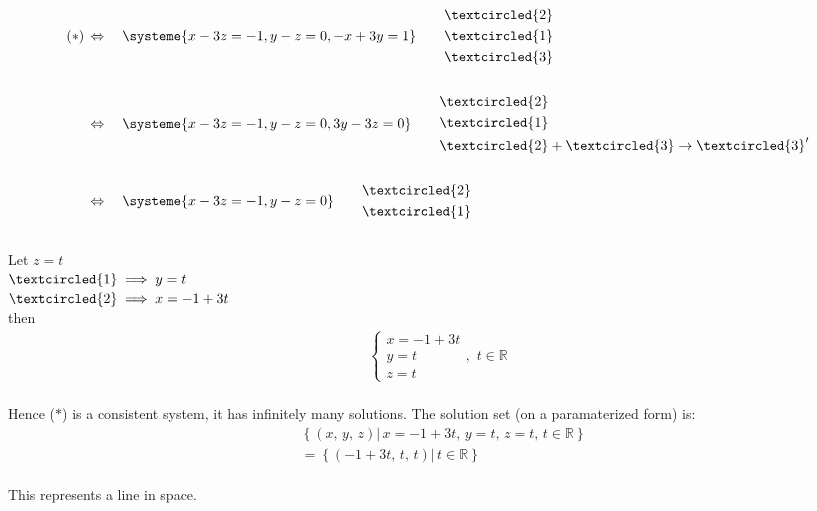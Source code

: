 \documentclass{jhwhw}
\begin{document}
\begin{align*} 
(\ast)\,&\Leftrightarrow \quad \systeme{x-3z=-1, y-z=0 , -x+3y=1} \quad \quad \begin{aligned} &\textcircled{2} \\ &\textcircled{1} \\ &\textcircled{3}\end{aligned}
\\ \\
&\Leftrightarrow \quad \systeme{x-3z=-1, y-z=0 , 3y-3z=0} \quad \quad \begin{aligned} &\textcircled{2} \\ &\textcircled{1} \\ &\textcircled{2}+\textcircled{3} \rightarrow \textcircled{3}'\end{aligned}
\\ \\
&\Leftrightarrow \quad \systeme{x-3z=-1, y-z=0} \quad \quad \begin{aligned} &\textcircled{2} \\ &\textcircled{1}\end{aligned}
\end{align*}
\\
Let \(z=t\)\\
\(\textcircled{1} \implies y = t\)\\
\(\textcircled{2} \implies x=-1 +3t\)\\
then \begin{align*} 
\begin{cases} x=-1+3t \\ y=t \\ z=t \end{cases} \text{, }\, t \in \mathbb{R} 
\end{align*}
\\
Hence (\(\ast\)) is a consistent system, it has infinitely many solutions. The solution set (on a paramaterized form) is:
\\
\begin{align*} 
    &\left\{(x,\,y,\,z) |\, x=-1+3t,\,y=t,\,z=t,\,t \in \mathbb{R}\right\}\\
    &=\left\{(-1+3t,\,t,\,t) |\,t \in \mathbb{R}  \right\}
\end{align*}
\\
This represents a line in space.
\\ \\
\end{document}
